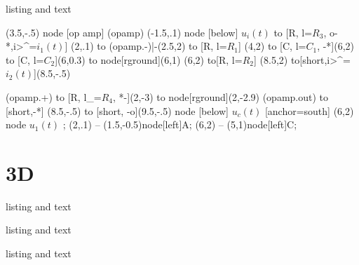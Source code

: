 \documentclass{tikznotes}
\begin{document}
\begin{tcblisting}{listing and text}  
\begin{circuitikz}[scale=0.8,>=latex]
\draw(3.5,-.5) node [op amp] (opamp) {}
(-1.5,.1) node [below] {$u_{i}(t)$} to [R, l=$R_3$, o-*,i>^=$i_{1}(t)$] (2,.1)
to  (opamp.-)|-(2.5,2) 
to [R, l=$R_{1}$] (4,2)
to [C, l=$C_{1}$, -*](6,2)
to [C, l=$C_{2}$](6,0.3) to node[rground]{}(6,1)
(6,2) to[R, l=$R_{2}$] (8.5,2) to[short,i>^=$i_{2}(t)$](8.5,-.5) 

(opamp.+) to [R, l_=$R_{4}$, *-](2,-3)
to node[rground]{}(2,-2.9)
(opamp.out) to [short,-*] (8.5,-.5) 
to [short, -o](9.5,-.5) node [below] {$u_{c}(t)$}
{[anchor=south] (6,2) node {$ u_{1}(t) $} };
\draw[->] (2,.1) -- (1.5,-0.5)node[left]{A};
\draw[->] (6,2) -- (5,1)node[left]{C};
\end{circuitikz}
\end{tcblisting}

\section{3D}
\begin{tcblisting}{listing and text}  
\end{tcblisting}


\begin{tcblisting}{listing and text}  

\end{tcblisting}

\begin{tcblisting}{listing and text}  

\end{tcblisting}
\end{document}
